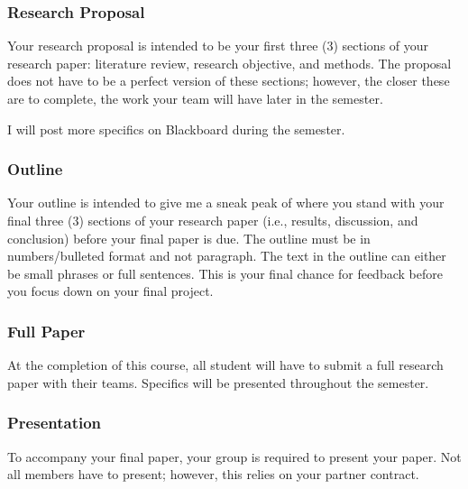 \documentclass[
  b5paper]{book}
\begin{document}
\hypertarget{research-proposal}{%
\subsubsection*{Research Proposal}\label{research-proposal}}

Your research proposal is intended to be your first three (3) sections of your research paper: literature review, research objective, and methods. The proposal does not have to be a perfect version of these sections; however, the closer these are to complete, the work your team will have later in the semester.

I will post more specifics on Blackboard during the semester.

\hypertarget{outline}{%
\subsubsection*{Outline}\label{outline}}

Your outline is intended to give me a sneak peak of where you stand with your final three (3) sections of your research paper (i.e., results, discussion, and conclusion) before your final paper is due. The outline must be in numbers/bulleted format and not paragraph. The text in the outline can either be small phrases or full sentences. This is your final chance for feedback before you focus down on your final project.

\hypertarget{full-paper}{%
\subsubsection*{Full Paper}\label{full-paper}}

At the completion of this course, all student will have to submit a full research paper with their teams. Specifics will be presented throughout the semester.

\hypertarget{presentation}{%
\subsubsection*{Presentation}\label{presentation}}

To accompany your final paper, your group is required to present your paper. Not all members have to present; however, this relies on your partner contract.
\end{document}
